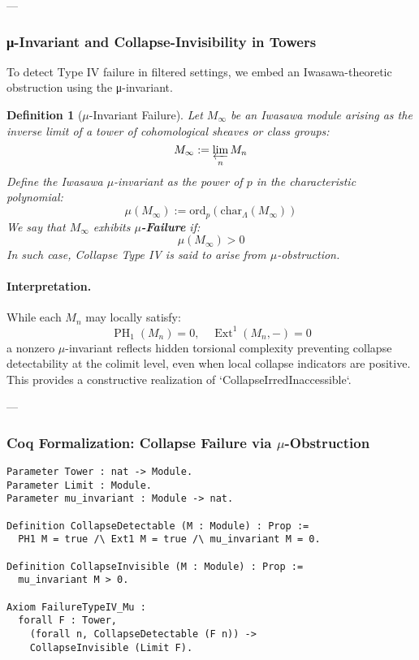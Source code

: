 \documentclass[11pt]{article}
\newtheorem{definition}[theorem]{Definition}
\DeclareMathOperator{\Ext}{Ext}
\DeclareMathOperator{\PH}{PH}
\begin{document}
---

\subsubsection*{μ-Invariant and Collapse-Invisibility in Towers}

To detect Type IV failure in filtered settings, we embed an Iwasawa-theoretic obstruction using the μ-invariant.

\begin{definition}[$\mu$-Invariant Failure]
Let $M_\infty$ be an Iwasawa module arising as the inverse limit of a tower of cohomological sheaves or class groups:
\[
M_\infty := \varprojlim_n M_n
\]
Define the Iwasawa $\mu$-invariant as the power of $p$ in the characteristic polynomial:
\[
\mu(M_\infty) := \mathrm{ord}_p \left( \mathrm{char}_\Lambda(M_\infty) \right)
\]
We say that $M_\infty$ exhibits \textbf{$\mu$-Failure} if:
\[
\mu(M_\infty) > 0
\]
In such case, Collapse Type IV is said to arise from $\mu$-obstruction.
\end{definition}

\paragraph{Interpretation.}
While each $M_n$ may locally satisfy:
\[
\PH_1(M_n) = 0, \quad \Ext^1(M_n, -) = 0
\]
a nonzero $\mu$-invariant reflects hidden torsional complexity preventing collapse detectability at the colimit level, even when local collapse indicators are positive. This provides a constructive realization of `CollapseIrredInaccessible`.

---

\subsubsection*{Coq Formalization: Collapse Failure via $\mu$-Obstruction}

\begin{lstlisting}[language=Coq, caption=Collapse Failure Classification via μ-Invariant]
Parameter Tower : nat -> Module.
Parameter Limit : Module.
Parameter mu_invariant : Module -> nat.

Definition CollapseDetectable (M : Module) : Prop :=
  PH1 M = true /\ Ext1 M = true /\ mu_invariant M = 0.

Definition CollapseInvisible (M : Module) : Prop :=
  mu_invariant M > 0.

Axiom FailureTypeIV_Mu :
  forall F : Tower,
    (forall n, CollapseDetectable (F n)) ->
    CollapseInvisible (Limit F).
\end{lstlisting}
\end{document}
